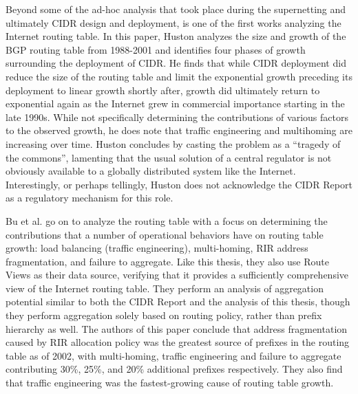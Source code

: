Beyond some of the ad-hoc analysis that took place during the supernetting
\cite{rfc1338} and ultimately CIDR \cite{rfc1519} design and deployment,
\cite{Huston:2001bs} is one of the first works analyzing the Internet routing
table. In this paper, Huston analyzes the size and growth of the BGP routing
table from 1988-2001 and identifies four phases of growth surrounding the
deployment of CIDR. He finds that while CIDR deployment did reduce the size of
the routing table and limit the exponential growth preceding its deployment to
linear growth shortly after, growth did ultimately return to exponential again
as the Internet grew in commercial importance starting in the late 1990s. While
not specifically determining the contributions of various factors to the
observed growth, he does note that traffic engineering and multihoming are
increasing over time. Huston concludes by casting the problem as a ``tragedy of
the commons'', lamenting that the usual solution of a central regulator is not
obviously available to a globally distributed system like the Internet.
Interestingly, or perhaps tellingly, Huston does not acknowledge the CIDR
Report as a regulatory mechanism for this role.

Bu et al. \cite{Bu:2004fk} go on to analyze the routing table with a focus on
determining the contributions that a number of operational behaviors have on
routing table growth: load balancing (traffic engineering), multi-homing, RIR
address fragmentation, and failure to aggregate. Like this thesis, they also
use Route Views as their data source, verifying that it provides a sufficiently
comprehensive view of the Internet routing table. They perform an analysis of
aggregation potential similar to both the CIDR Report and the analysis of this
thesis, though they perform aggregation solely based on routing policy, rather
than prefix hierarchy as well. The authors of this paper conclude that address
fragmentation caused by RIR allocation policy was the greatest source of
prefixes in the routing table as of 2002, with multi-homing, traffic
engineering and failure to aggregate contributing 30\%, 25\%, and 20\%
additional prefixes respectively. They also find that traffic engineering was
the fastest-growing cause of routing table growth.

